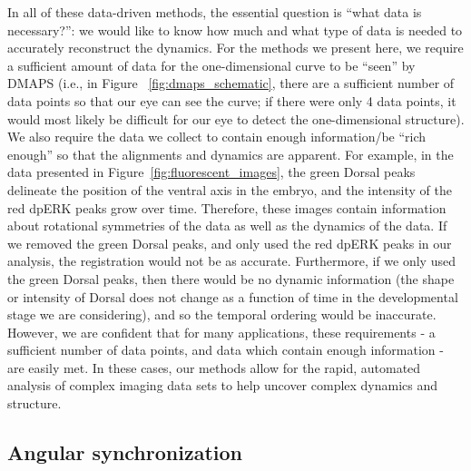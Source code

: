 \documentclass{pnastwo}
\begin{document}
\begin{article}
In all of these data-driven methods, the essential question is ``what data is necessary?'': we would like to know how much and what type of data is needed to accurately reconstruct the dynamics. 
%
For the methods we present here, we require a sufficient amount of data for the one-dimensional curve to be ``seen'' by DMAPS (i.e., in Figure ~\ref{fig:dmaps_schematic}, there are a sufficient number of data points so that our eye can see the curve; if there were only 4 data points, it would most likely be difficult for our eye to detect the one-dimensional structure).
%
We also require the data we collect to contain enough information/be ``rich enough'' so that the alignments and dynamics are apparent.
%
For example, in the data presented in Figure~\ref{fig:fluorescent_images}, the green Dorsal peaks delineate the position of the ventral axis in the embryo, and the intensity of the red dpERK peaks grow over time.
%
Therefore, these images contain information about rotational symmetries of the data as well as the dynamics of the data.
%
If we removed the green Dorsal peaks, and only used the red dpERK peaks in our analysis, the registration would not be as accurate.
%
Furthermore, if we only used the green Dorsal peaks, then there would be no dynamic information (the shape or intensity of Dorsal does not change as a function of time in the developmental stage we are considering), and so the temporal ordering would be inaccurate.
%
However, we are confident that for many applications, these requirements - a sufficient number of data points, and data which contain enough information - are easily met. 
%
In these cases, our methods allow for the rapid, automated analysis of complex imaging data sets to help uncover complex dynamics and structure. 





\begin{materials}

\section{Angular synchronization \cite{singer2011angular}}


\end{materials}
\end{article}
\end{document}
